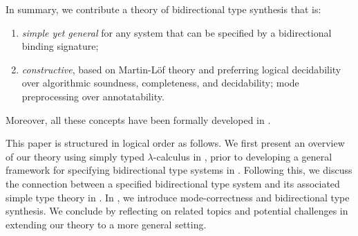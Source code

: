 In summary, we contribute a theory of bidirectional type synthesis that is:
\begin{enumerate}
  \item \emph{simple yet general} for any system that can be specified by a bidirectional binding signature;
  \item \emph{constructive}, based on Martin-L\"of theory and preferring logical decidability over algorithmic soundness, completeness, and decidability; mode preprocessing over annotatability.
\end{enumerate}
Moreover, all these concepts have been formally developed in \Agda.

This paper is structured in logical order as follows.
We first present an overview of our theory using simply typed $\lambda$-calculus in , prior to developing a general framework for specifying bidirectional type systems in .
Following this, we discuss the connection between a specified bidirectional type system and its associated simple type theory in .
In , we introduce mode-correctness and bidirectional type synthesis.
We conclude by reflecting on related topics and potential challenges in extending our theory to a more general setting.

